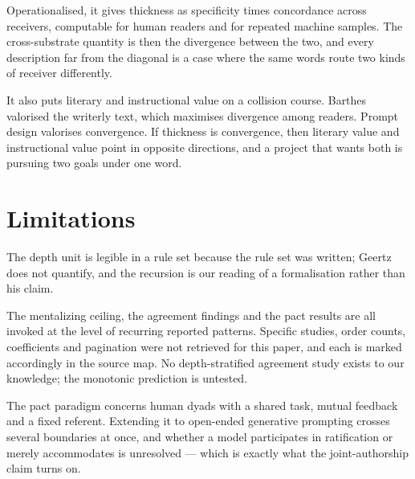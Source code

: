 \documentclass[11pt,a4paper]{article}
\begin{document}
Operationalised, it gives thickness as specificity times concordance across receivers, computable for human readers and for repeated machine samples. The cross-substrate quantity is then the divergence between the two, and every description far from the diagonal is a case where the same words route two kinds of receiver differently.

It also puts literary and instructional value on a collision course. Barthes valorised the writerly text, which maximises divergence among readers. Prompt design valorises convergence. If thickness is convergence, then literary value and instructional value point in opposite directions, and a project that wants both is pursuing two goals under one word.

\section{Limitations}
The depth unit is legible in a rule set because the rule set was written; Geertz does not quantify, and the recursion is our reading of a formalisation rather than his claim.

The mentalizing ceiling, the agreement findings and the pact results are all invoked at the level of recurring reported patterns. Specific studies, order counts, coefficients and pagination were not retrieved for this paper, and each is marked accordingly in the source map. No depth-stratified agreement study exists to our knowledge; the monotonic prediction is untested.

The pact paradigm concerns human dyads with a shared task, mutual feedback and a fixed referent. Extending it to open-ended generative prompting crosses several boundaries at once, and whether a model participates in ratification or merely accommodates is unresolved --- which is exactly what the joint-authorship claim turns on.
\end{document}
